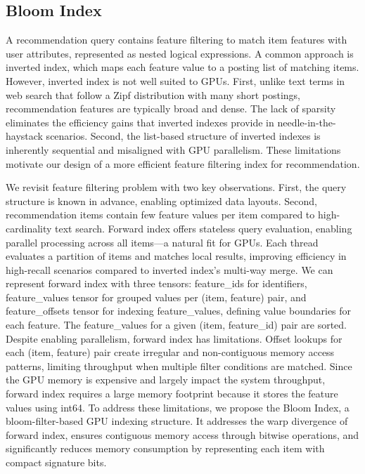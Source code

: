 \subsection{Bloom Index}
\label{sec:4.1}
A recommendation query contains feature filtering to match item features with user attributes, represented as nested logical expressions. A common approach is inverted index, which maps each feature value to a posting list of matching items.
However, inverted index is not well suited to GPUs. First, unlike text terms in web search that follow a Zipf distribution with many short postings, recommendation features are typically broad and dense. The lack of sparsity eliminates the efficiency gains that inverted indexes provide in needle-in-the-haystack scenarios. Second, the list-based structure of inverted indexes is inherently sequential and misaligned with GPU parallelism. These limitations motivate our design of a more efficient feature filtering index for recommendation.

We revisit feature filtering problem with two key observations. 
First, the query structure is known in advance, enabling optimized data layouts.
Second, recommendation items contain few feature values per item compared to high-cardinality text search.
Forward index offers stateless query evaluation, enabling parallel processing across all items—a natural fit for GPUs.
Each thread evaluates a partition of items and matches local results, improving efficiency in high-recall scenarios compared to inverted index's multi-way merge. We can represent forward index with three tensors: feature\_ids for identifiers, feature\_values tensor for grouped values per (item, feature) pair, and feature\_offsets tensor for indexing feature\_values, defining value boundaries for each feature. The
feature\_values for a given (item, feature\_id) pair are sorted.
Despite enabling parallelism, forward index has limitations. Offset lookups for each (item, feature) pair create irregular and non-contiguous memory access patterns, limiting throughput when multiple filter conditions are matched. Since the GPU memory is expensive and largely impact the system throughput, forward index requires a large memory footprint because it stores the feature values using int64. To address these limitations, we propose the Bloom Index, a bloom-filter-based GPU indexing structure. It addresses the warp divergence of forward index, ensures contiguous memory access through bitwise operations, and significantly reduces memory consumption by representing each item with compact signature bits.


